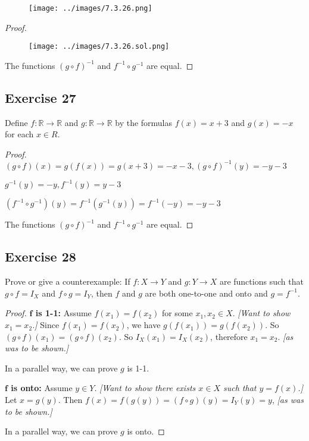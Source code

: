 \documentclass[14pt]{extarticle}
\newcommand{\R}{\mathbb{R}}
\begin{document}
\begin{figure}[ht!]
    \centering
    \texttt{[image: ../images/7.3.26.png]}
\end{figure}

\begin{proof}
    \begin{figure}[ht!]
        \centering
        \texttt{[image: ../images/7.3.26.sol.png]}
    \end{figure}

    The functions \((g \circ f)^{-1}\) and \(f^{-1} \circ g^{-1}\) are equal.
\end{proof}

\subsection{Exercise 27}
Define \(f: \R \to \R\) and \(g: \R \to \R\) by the formulas \(f(x) = x + 3\) and \(g(x) = -x\) for each \(x \in R\).

\begin{proof}
    \((g \circ f)(x) = g(f(x)) = g(x+3) = -x-3, (g \circ f)^{-1}(y) = -y-3\)

    \(g^{-1}(y) = -y, f^{-1}(y) = y - 3\)

    \((f^{-1} \circ g^{-1})(y) = f^{-1}(g^{-1}(y)) = f^{-1}(-y) = -y-3\)

    The functions \((g \circ f)^{-1}\) and \(f^{-1} \circ g^{-1}\) are equal.
\end{proof}

\subsection{Exercise 28}
Prove or give a counterexample: If \(f: X \to Y\) and \(g: Y \to X\) are functions such that \(g \circ f = I_X\) and
\(f \circ g = I_Y\), then $f$ and $g$ are both one-to-one and onto and \(g = f^{-1}\).

\begin{proof}
    {\bf $\bm{f}$ is 1-1:} Assume \(f(x_1) = f(x_2)\) for some \(x_1, x_2 \in X\). {\it [Want to show \(x_1 = x_2\).]}
    Since \(f(x_1) = f(x_2)\), we have \(g(f(x_1))=g(f(x_2))\). So \((g \circ f)(x_1) = (g \circ f)(x_2)\).
    So \(I_X(x_1) = I_X(x_2)\), therefore \(x_1 = x_2\). {\it [as was to be shown.]}

    In a parallel way, we can prove $g$ is 1-1.

    {\bf $\bm{f}$ is onto:} Assume \(y \in Y\). {\it [Want to show there exists \(x \in X\) such that \(y = f(x)\).]}
    Let \(x = g(y)\). Then \(f(x) = f(g(y)) = (f \circ g)(y) = I_Y(y) = y\), {\it [as was to be shown.]}

    In a parallel way, we can prove $g$ is onto.
\end{proof}
\end{document}
